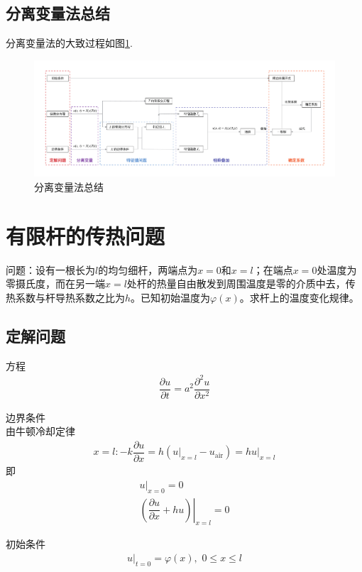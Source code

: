 \subsection{分离变量法总结}
分离变量法的大致过程如图\ref{分离变量}.
\begin{figure}[!htb]
	\centering
	\includegraphics[width=\linewidth]{pic/分离变量.pdf}
	\caption{分离变量法总结}
	\label{分离变量}
\end{figure}

\section{有限杆的传热问题}
问题：设有一根长为$l$的均匀细杆，两端点为$x = 0$和$x = l$；在端点$x = 0$处温度为零摄氏度，而在另一端$x = l$处杆的热量自由散发到周围温度是零的介质中去，传热系数与杆导热系数之比为$h$。已知初始温度为$\varphi(x)$。求杆上的温度变化规律。

\subsection{定解问题}
方程
\begin{align}
	\dfrac{\partial u}{\partial t} = a^2 \dfrac{\partial^2 u}{\partial x^2}
\end{align}

边界条件\\
由牛顿冷却定律
\begin{align*}
	x= l: - k \dfrac{\partial u}{\partial x} = h(\left. u\right|_{x = l} - u_{\text{air}})=h\left. u\right|_{x = l}
\end{align*}
即
\begin{align}
	\left. u \right|_{x =0} = 0\\
	\left. \left(\dfrac{\partial u}{\partial x} + hu\right)\right|_{x = l} = 0
\end{align}

初始条件
\begin{align}
	\left. u \right|_{t = 0} = \varphi(x),\,\, 0 \le x \le l
\end{align}

